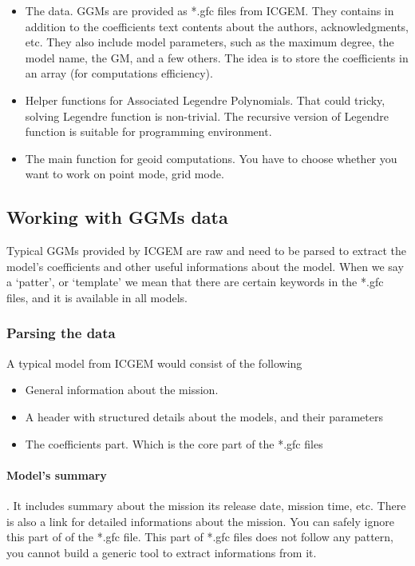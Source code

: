 \begin{itemize}
	\item The data. GGMs are provided as *.gfc files from ICGEM. They contains in addition to the coefficients text contents about the authors, acknowledgments, etc. They also include model parameters, such as the maximum degree, the model name, the GM, and a few others. The idea is to store the coefficients in an array (for computations efficiency). 
	\item Helper functions for Associated Legendre Polynomials. That could tricky, solving Legendre function is non-trivial. The recursive version of Legendre function is suitable for programming environment.
	\item The main function for geoid computations. You have to choose whether you want to work on point mode, grid mode.
\end{itemize}

\subsection{Working with GGMs data}

Typical GGMs provided by ICGEM are raw and need to be parsed to extract the model's coefficients and other useful informations about the model. When we say a `patter', or `template' we mean that there are certain keywords in the *.gfc files, and it is available in all models.

\subsubsection{Parsing the data}
A typical model from ICGEM would consist of the following

\begin{itemize}
	\item {General information about the mission}. 
	\item {A header with structured details about the models, and their parameters}
	\item {The coefficients part. Which is the core part of the *.gfc files}
\end{itemize}

	\paragraph{Model's summary}. It includes summary about the mission its release date, mission time, etc. There is also a link for detailed informations about the mission. You can safely ignore this part of of the *.gfc file. This part of *.gfc files does not follow any pattern, you cannot build a generic tool to extract informations from it.
